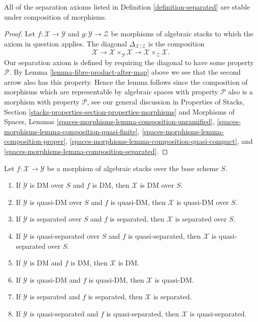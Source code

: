\begin{lemma}
\label{lemma-composition-separated}
All of the separation axioms listed in
Definition \ref{definition-separated}
are stable under composition of morphisms.
\end{lemma}

\begin{proof}
Let $f : \mathcal{X} \to \mathcal{Y}$ and
$g : \mathcal{Y} \to \mathcal{Z}$ be morphisms of algebraic stacks
to which the axiom in question applies.
The diagonal $\Delta_{\mathcal{X}/\mathcal{Z}}$ is the composition
$$
\mathcal{X} \longrightarrow
\mathcal{X} \times_\mathcal{Y} \mathcal{X} \longrightarrow
\mathcal{X} \times_\mathcal{Z} \mathcal{X}.
$$
Our separation axiom is defined by requiring the diagonal
to have some property $\mathcal{P}$. By
Lemma \ref{lemma-fibre-product-after-map}
above we see that the second arrow also has this property.
Hence the lemma follows since the composition of
morphisms which are representable by algebraic spaces with property
$\mathcal{P}$ also is a morphism with property $\mathcal{P}$, see
our general discussion in
Properties of Stacks,
Section \ref{stacks-properties-section-properties-morphisms}
and
Morphisms of Spaces, Lemmas
\ref{spaces-morphisms-lemma-composition-unramified},
\ref{spaces-morphisms-lemma-composition-quasi-finite},
\ref{spaces-morphisms-lemma-composition-proper},
\ref{spaces-morphisms-lemma-composition-quasi-compact}, and
\ref{spaces-morphisms-lemma-composition-separated}.
\end{proof}

\begin{lemma}
\label{lemma-separated-over-separated}
Let $f : \mathcal{X} \to \mathcal{Y}$ be a morphism of algebraic stacks
over the base scheme $S$.
\begin{enumerate}
\item If $\mathcal{Y}$ is DM over $S$ and $f$ is DM,
then $\mathcal{X}$ is DM over $S$.
\item If $\mathcal{Y}$ is quasi-DM over $S$ and $f$ is quasi-DM,
then $\mathcal{X}$ is quasi-DM over $S$.
\item If $\mathcal{Y}$ is separated over $S$ and $f$ is separated,
then $\mathcal{X}$ is separated over $S$.
\item If $\mathcal{Y}$ is quasi-separated over $S$ and $f$ is quasi-separated,
then $\mathcal{X}$ is quasi-separated over $S$.
\item If $\mathcal{Y}$ is DM and $f$ is DM,
then $\mathcal{X}$ is DM.
\item If $\mathcal{Y}$ is quasi-DM and $f$ is quasi-DM,
then $\mathcal{X}$ is quasi-DM.
\item If $\mathcal{Y}$ is separated and $f$ is separated,
then $\mathcal{X}$ is separated.
\item If $\mathcal{Y}$ is quasi-separated and $f$ is quasi-separated,
then $\mathcal{X}$ is quasi-separated.
\end{enumerate}
\end{lemma}

